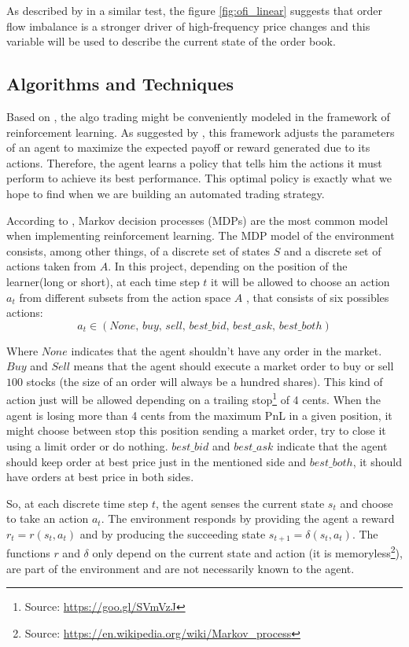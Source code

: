 \documentclass[a4paper]{article}
\begin{document}
As described by \cite{cont2014price} in a similar test, the figure \ref{fig:ofi_linear} suggests that order flow imbalance is a stronger driver of high-frequency price changes and this variable will be used to describe the current state of the order book.

\subsection{Algorithms and Techniques}
Based on \cite{cont2014price}, the algo trading might be conveniently modeled in the framework of reinforcement learning. As suggested by \cite{du1algorithm}, this framework adjusts the parameters of an agent to maximize the expected payoff or reward generated due to its actions. Therefore, the agent learns a policy that tells him the actions it must perform to achieve its best performance. This optimal policy is exactly what we hope to find when we are building an automated trading strategy.

According to \cite{chan2001electronic}, Markov decision processes (MDPs) are the most common model when implementing reinforcement learning.  The MDP model of the environment consists, among other things, of a discrete set of states $S$ and a discrete set of actions taken from $A$. In this project, depending on the position of the learner(long or short), at each time step $t$ it will be allowed to choose an action $a_t$ from different subsets from the action space $A$ , that consists of six possibles actions:
$$a_t \in \left (None,\, buy,\, sell,\, best\_bid,\, best\_ask,\, best\_both \right)$$

Where $None$ indicates that the agent shouldn't have any order in the market. $Buy$ and $Sell$ means that the agent should execute a market order to buy or sell $100$ stocks (the size of an order will always be a hundred shares). This kind of action just will be allowed depending on a trailing stop\footnote{Source: \url{https://goo.gl/SVmVzJ}} of 4 cents. When the agent is losing more than 4 cents from the maximum PnL in a given position, it might choose between stop this position sending a market order, try to close it using a limit order or do nothing. $best\_bid$ and $best\_ask$ indicate that the agent should keep order at best price just in the mentioned side and $best\_both$, it should have orders at best price in both sides.

So, at each discrete time step $t$, the agent senses the current state $s_t$ and choose to take an action $a_t$. The environment responds by providing the agent a reward $r_t=r(s_t, a_t)$ and by producing the succeeding state $s_{t+1}=\delta(s_t, a_t)$. The functions $r$ and $\delta$ only depend on the current state and action (it is memoryless\footnote{Source: \url{https://en.wikipedia.org/wiki/Markov_process}}), are part of the environment and are not necessarily known to the agent.
\end{document}
